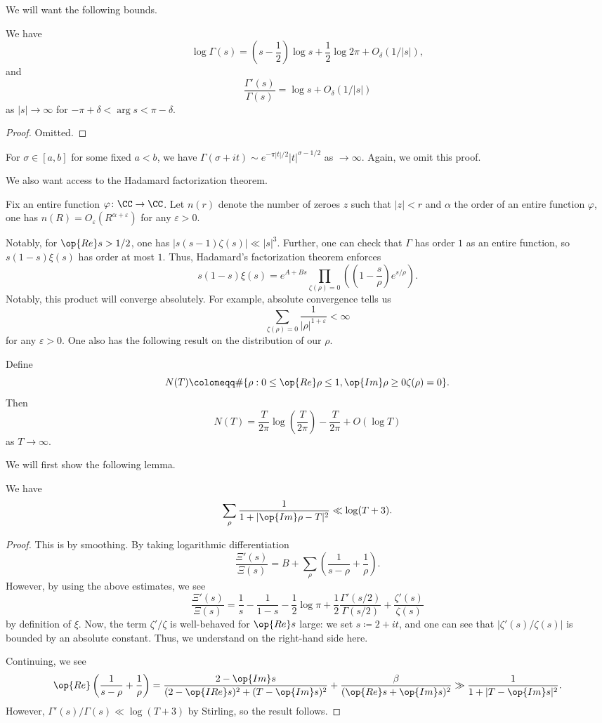 \documentclass[../notes.tex]{subfiles}
\begin{document}
We will want the following bounds.
\begin{lemma}[Stirling]
	We have
	\[\log\Gamma(s)=\left(s-\frac12\right)\log s+\frac12\log2\pi+O_\delta(1/|s|),\]
	and
	\[\frac{\Gamma'(s)}{\Gamma(s)}=\log s+O_\delta(1/|s|)\]
	as $|s|\to\infty$ for $-\pi+\delta<\arg s<\pi-\delta$.
\end{lemma}
\begin{proof}
	Omitted.
\end{proof}
\begin{remark}
	For $\sigma\in[a,b]$ for some fixed $a<b$, we have $\Gamma(\sigma+it)\sim e^{-\pi|t|/2}|t|^{\sigma-1/2}$ as $\to\infty$. Again, we omit this proof.
\end{remark}
We also want access to the Hadamard factorization theorem.
\begin{theorem}
	Fix an entire function $\varphi\colon\CC\to\CC$. Let $n(r)$ denote the number of zeroes $z$ such that $|z|<r$ and $\alpha$ the order of an entire function $\varphi$, one has $n(R)=O_\varepsilon\left(R^{\alpha+\varepsilon}\right)$ for any $\varepsilon>0$.
\end{theorem}
Notably, for $\op{Re}s>1/2$, one has $|s(s-1)\zeta(s)|\ll|s|^3$. Further, one can check that $\Gamma$ has order $1$ as an entire function, so $s(1-s)\xi(s)$ has order at most $1$. Thus, Hadamard's factorization theorem enforces
\[s(1-s)\xi(s)=e^{A+Bs}\prod_{\zeta(\rho)=0}\left(\left(1-\frac s\rho\right)e^{s/\rho}\right).\]
Notably, this product will converge absolutely. For example, absolute convergence tells us
\[\sum_{\zeta(\rho)=0}\frac1{|\rho|^{1+\varepsilon}}<\infty\]
for any $\varepsilon>0$. One also has the following result on the distribution of our $\rho$.
\begin{theorem}
	Define
	\[N(T)\coloneqq\#\{\rho:0\le\op{Re}\rho\le1,\op{Im}\rho\ge0\zeta(\rho)=0\}.\]
	Then
	\[N(T)=\frac T{2\pi}\log\left(\frac T{2\pi}\right)-\frac T{2\pi}+O(\log T)\]
	as $T\to\infty$.
\end{theorem}
We will first show the following lemma.
\begin{lemma}
	We have
	\[\sum_\rho\frac1{1+|\op{Im}\rho-T|^2}\ll\log(T+3).\]
\end{lemma}
\begin{proof}
	This is by smoothing. By taking logarithmic differentiation
	\[\frac{\Xi'(s)}{\Xi(s)}=B+\sum_\rho\left(\frac1{s-\rho}+\frac1\rho\right).\]
	However, by using the above estimates, we see
	\[\frac{\Xi'(s)}{\Xi(s)}=\frac1s-\frac1{1-s}-\frac12\log\pi+\frac12\frac{\Gamma'(s/2)}{\Gamma(s/2)}+\frac{\zeta'(s)}{\zeta(s)}\]
	by definition of $\xi$. Now, the term $\zeta'/\zeta$ is well-behaved for $\op{Re}s$ large: we set $s\coloneqq2+it$, and one can see that $|\zeta'(s)/\zeta(s)|$ is bounded by an absolute constant. Thus, we understand on the right-hand side here.

	Continuing, we see
	\[\op{Re}\left(\frac1{s-\rho}+\frac1\rho\right)=\frac{2-\op{Im}s}{(2-\op{IRe}s)^2+(T-\op{Im}s)^2}+\frac\beta{(\op{Re}s+\op{Im}s)^2}\gg\frac1{1+|T-\op{Im}s|^2}.\]
	However, $\Gamma'(s)/\Gamma(s)\ll\log(T+3)$ by Stirling, so the result follows.
\end{proof}
\end{document}
